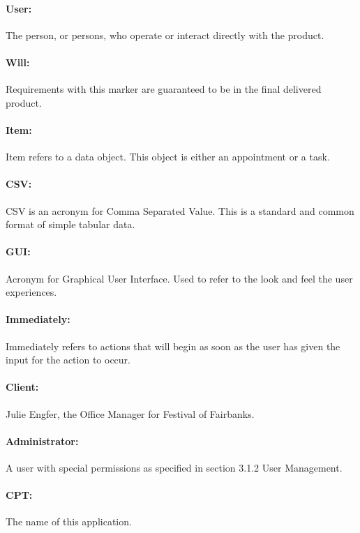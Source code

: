 \documentclass[12pt]{article}
\begin{document}
\paragraph{User:} The person, or persons, who operate or interact directly with the product.
\paragraph{Will:} Requirements with this marker are guaranteed to be in the final delivered product.
\paragraph{Item:} Item refers to a data object. This object is either an appointment or a task.
\paragraph{CSV:} CSV is an acronym for Comma Separated Value. This is a standard and common format of simple tabular data.

\paragraph{GUI:} Acronym for Graphical User Interface. Used to refer to the look and feel the user experiences.
\paragraph{Immediately:} Immediately refers to actions that will begin as soon as the user has given the input for the action to occur.
\paragraph{Client:} Julie Engfer, the Office Manager for Festival of Fairbanks.
\paragraph{Administrator:} A user with special permissions as specified in section 3.1.2 User Management.
\paragraph{CPT:} The name of this application.
\end{document}
